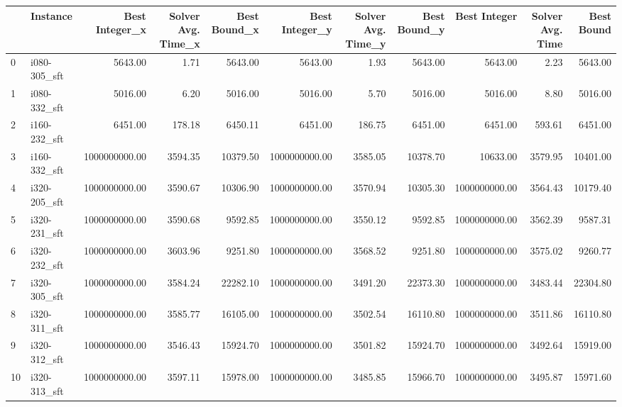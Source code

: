 \begin{tabular}{llrrrrrrrrr}
\toprule
{} &      Instance &  Best Integer\_x &  Solver Avg. Time\_x &  Best Bound\_x &  Best Integer\_y &  Solver Avg. Time\_y &  Best Bound\_y &  Best Integer &  Solver Avg. Time &  Best Bound \\
\midrule
0  &  i080-305\_sft &         5643.00 &                1.71 &       5643.00 &         5643.00 &                1.93 &       5643.00 &       5643.00 &              2.23 &     5643.00 \\
1  &  i080-332\_sft &         5016.00 &                6.20 &       5016.00 &         5016.00 &                5.70 &       5016.00 &       5016.00 &              8.80 &     5016.00 \\
2  &  i160-232\_sft &         6451.00 &              178.18 &       6450.11 &         6451.00 &              186.75 &       6451.00 &       6451.00 &            593.61 &     6451.00 \\
3  &  i160-332\_sft &   1000000000.00 &             3594.35 &      10379.50 &   1000000000.00 &             3585.05 &      10378.70 &      10633.00 &           3579.95 &    10401.00 \\
4  &  i320-205\_sft &   1000000000.00 &             3590.67 &      10306.90 &   1000000000.00 &             3570.94 &      10305.30 & 1000000000.00 &           3564.43 &    10179.40 \\
5  &  i320-231\_sft &   1000000000.00 &             3590.68 &       9592.85 &   1000000000.00 &             3550.12 &       9592.85 & 1000000000.00 &           3562.39 &     9587.31 \\
6  &  i320-232\_sft &   1000000000.00 &             3603.96 &       9251.80 &   1000000000.00 &             3568.52 &       9251.80 & 1000000000.00 &           3575.02 &     9260.77 \\
7  &  i320-305\_sft &   1000000000.00 &             3584.24 &      22282.10 &   1000000000.00 &             3491.20 &      22373.30 & 1000000000.00 &           3483.44 &    22304.80 \\
8  &  i320-311\_sft &   1000000000.00 &             3585.77 &      16105.00 &   1000000000.00 &             3502.54 &      16110.80 & 1000000000.00 &           3511.86 &    16110.80 \\
9  &  i320-312\_sft &   1000000000.00 &             3546.43 &      15924.70 &   1000000000.00 &             3501.82 &      15924.70 & 1000000000.00 &           3492.64 &    15919.00 \\
10 &  i320-313\_sft &   1000000000.00 &             3597.11 &      15978.00 &   1000000000.00 &             3485.85 &      15966.70 & 1000000000.00 &           3495.87 &    15971.60 \\

\end{tabular}
